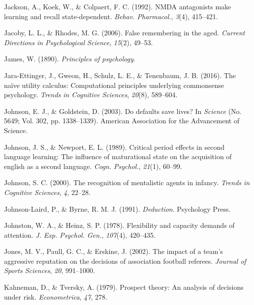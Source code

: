 \documentclass[
]{krantz}
\newlength{\cslhangindent}
\newenvironment{CSLReferences}[2] %
 {\begin{list}{}{%
  \setlength{\itemindent}{0pt}
  \setlength{\leftmargin}{0pt}
  \setlength{\parsep}{0pt}
  \ifodd #1
   \setlength{\leftmargin}{\cslhangindent}
   \setlength{\itemindent}{-1\cslhangindent}
  \fi
  \setlength{\itemsep}{#2\baselineskip}}}
 {\end{list}}
\begin{document}
\begin{CSLReferences}{1}{0}
Jackson, A., Koek, W., \& Colpaert, F. C. (1992). {NMDA} antagonists make learning and recall state-dependent. \emph{Behav. Pharmacol.}, \emph{3}(4), 415--421.

Jacoby, L. L., \& Rhodes, M. G. (2006). False remembering in the aged. \emph{Current Directions in Psychological Science}, \emph{15}(2), 49--53.

James, W. (1890). \emph{Principles of psychology}.

Jara-Ettinger, J., Gweon, H., Schulz, L. E., \& Tenenbaum, J. B. (2016). The naïve utility calculus: Computational principles underlying commonsense psychology. \emph{Trends in Cognitive Sciences}, \emph{20}(8), 589--604.

Johnson, E. J., \& Goldstein, D. (2003). Do defaults save lives? In \emph{Science} (No. 5649; Vol. 302, pp. 1338--1339). American Association for the Advancement of Science.

Johnson, J. S., \& Newport, E. L. (1989). Critical period effects in second language learning: The influence of maturational state on the acquisition of english as a second language. \emph{Cogn. Psychol.}, \emph{21}(1), 60--99.

Johnson, S. C. (2000). The recognition of mentalistic agents in infancy. \emph{Trends in Cognitive Sciences}, \emph{4}, 22--28.

Johnson-Laird, P., \& Byrne, R. M. J. (1991). \emph{Deduction}. Psychology Press.

Johnston, W. A., \& Heinz, S. P. (1978). Flexibility and capacity demands of attention. \emph{J. Exp. Psychol. Gen.}, \emph{107}(4), 420--435.

Jones, M. V., Paull, G. C., \& Erskine, J. (2002). The impact of a team's aggressive reputation on the decisions of association football referees. \emph{Journal of Sports Sciences}, \emph{20}, 991--1000.

Kahneman, D., \& Tversky, A. (1979). Prospect theory: An analysis of decisions under risk. \emph{Econometrica}, \emph{47}, 278.


\end{CSLReferences}
\end{document}
